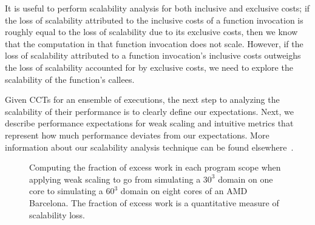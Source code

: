 \documentclass[11pt,letterpaper]{report}
\begin{document}
It is useful to perform scalability analysis for both inclusive and exclusive costs; if the loss of scalability attributed to the inclusive costs of a function invocation is roughly equal to the loss of scalability due to its exclusive costs, then we know that the computation in that function invocation does not scale.
However, if the loss of scalability attributed to a function invocation's inclusive costs outweighs the loss of scalability accounted for by exclusive costs, we need to explore the scalability of the function's callees.

Given CCTs for an ensemble of executions, the next step to analyzing the scalability of their performance is to clearly define our expectations.
Next, we describe performance expectations for weak scaling and intuitive metrics that represent how much performance deviates from our expectations.
More information about our scalability analysis technique can be found elsewhere~\cite{Coarfa-MC:2007:ICS-scalability,Tallent-MC-etal:2009:SC-hpctoolkit-petascale}.

\begin{figure}[t]
\caption{Computing the fraction of excess work in each program scope when applying weak scaling to go from simulating a $30^3$ domain on one core to simulating a $60^3$ domain on eight cores of an AMD Barcelona. The fraction of excess work is a quantitative measure of scalability loss.}
\label{fig:scaling-loss}
\end{figure}
\end{document}

